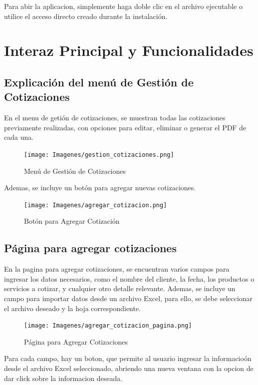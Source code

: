 \documentclass{Pretexto/bluereport}
\begin{document}
Para abir la aplicacion, simplemente haga doble clic en el archivo ejecutable o utilice el acceso directo creado durante la instalación.
\section{Interaz Principal y Funcionalidades}
\subsection{Explicación del menú de Gestión de Cotizaciones}

En el menu de getión de cotizaciones, se muestran todas las cotizaciones previamente realizadas, con opciones para editar, eliminar o generar el PDF de cada una.

\begin{figure}[H]
    \centering
    \texttt{[image: Imagenes/gestion\_cotizaciones.png]}
    \caption{Menú de Gestión de Cotizaciones}
    \label{fig:gestion_cotizaciones}
\end{figure}

Ademas, se incluye un botón para agregar nuevas cotizaciones.

\begin{figure}[H]
    \centering
    \texttt{[image: Imagenes/agregar\_cotizacion.png]}
    \caption{Botón para Agregar Cotización}
    \label{fig:agregar_cotizacion}
\end{figure}

\subsection{Página para agregar cotizaciones}

En la pagina para agregar cotizaciones, se encuentran varios campos para ingresar los datos necesarios, como el nombre del cliente, la fecha, los productos o servicios a cotizar, y cualquier otro detalle relevante.
Ademas, se incluye un campo para importar datos desde un archivo Excel, para ello, se debe seleccionar el archivo deseado y la hoja correspondiente.

\begin{figure}[H]
    \centering
    \texttt{[image: Imagenes/agregar\_cotizacion\_pagina.png]}
    \caption{Página para Agregar Cotizaciones}
    \label{fig:agregar_cotizacion_pagina}
\end{figure}

Para cada campo, hay un boton, que permite al usuario ingresar la informacioón desde el archivo Excel seleccionado, abriendo una nueva ventana con la opcion de dar click sobre la informacion deseada.
\end{document}
